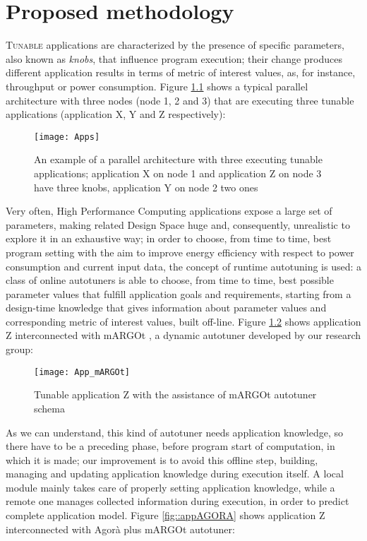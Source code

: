 \chapter{Proposed methodology}\label{methodology}

\lettrine{T}{unable} applications are characterized by the presence of specific parameters, also known as \textit{knobs}, that influence program execution; their change produces different application results in terms of metric of interest values, as, for instance, throughput or power consumption. Figure \ref{fig::appDef} shows a typical parallel architecture with three nodes (node 1, 2 and 3) that are executing three tunable applications (application X, Y and Z respectively):

\begin{figure}[H]

    \centering
    \texttt{[image: Apps]}
    \caption{An example of a parallel architecture with three executing tunable applications; application X on node 1 and application Z on node 3 have three knobs, application Y on node 2 two ones}
    \label{fig::appDef}
    
\end{figure}

Very often, High Performance Computing applications expose a large set of parameters, making related Design Space huge and, consequently, unrealistic to explore it in an exhaustive way; in order to choose, from time to time, best program setting with the aim to improve energy efficiency with respect to power consumption and current input data, the concept of runtime autotuning is used: a class of online autotuners is able to choose, from time to time, best possible parameter values that fulfill application goals and requirements, starting from a design-time knowledge that gives information about parameter values and corresponding metric of interest values, built off-line. Figure \ref{fig::appAut} shows application Z interconnected with mARGOt \cite{gadioli2015application}, a dynamic autotuner developed by our research group:

\begin{figure}[H]

    \centering
    \texttt{[image: App\_mARGOt]}
    \caption{Tunable application Z with the assistance of mARGOt autotuner schema}
    \label{fig::appAut}
    
\end{figure}

As we can understand, this kind of autotuner needs application knowledge, so there have to be a preceding phase, before program start of computation, in which it is made; our improvement is to avoid this offline step, building, managing and updating application knowledge during execution itself. A local module mainly takes care of properly setting application knowledge, while a remote one manages collected information during execution, in order to predict complete application model. Figure \ref{fig::appAGORA} shows application Z interconnected with Agorà plus mARGOt autotuner:

